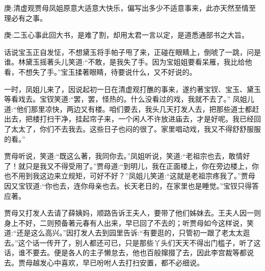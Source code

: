 

\begin{parag}
    \begin{note}庚:清虚观贾母凤姐原意大适意大快乐，偏写出多少不适意事来，此亦天然至情至理必有之事。\end{note}
\end{parag}


\begin{parag}
    \begin{note}庚:二玉心事此回大书，是难了割，却用太君一言以定，是道悉通部书之大旨。\end{note}
\end{parag}


\begin{parag}
    话说宝玉正自发怔，不想黛玉将手帕子甩了来，正碰在眼睛上，倒唬了一跳，问是谁。林黛玉摇著头儿笑道:“不敢，是我失了手。因为宝姐姐要看呆雁，我比给他看，不想失了手。”宝玉揉著眼睛，待要说什么，又不好说的。
\end{parag}


\begin{parag}
    一时，凤姐儿来了，因说起初一日在清虚观打醮的事来，遂约著宝钗、宝玉、黛玉等看戏去。宝钗笑道:“罢，罢，怪热的。什么没看过的戏，我就不去了。” 凤姐儿道:“他们那里凉快，两边又有楼。咱们要去，我头几天打发人去，把那些道士都赶出去，把楼打扫干净，挂起帘子来，一个闲人不许放进庙去，才是好呢。我已经回了太太了，你们不去我去。这些日子也闷的很了。家里唱动戏，我又不得舒舒服服的看。”
\end{parag}


\begin{parag}
    贾母听说，笑道:“既这么著，我同你去。”凤姐听说，笑道:“老祖宗也去，敢情好了！就只是我又不得受用了。”贾母道:“到明儿，我在正面楼上，你在旁边楼上，你也不用到我这边来立规矩，可好不好？”凤姐儿笑道:“这就是老祖宗疼我了。”贾母因又宝钗道:“你也去，连你母亲也去。长天老日的，在家里也是睡觉。”宝钗只得答应著。
\end{parag}


\begin{parag}
    贾母又打发人去请了薛姨妈，顺路告诉王夫人，要带了他们姊妹去。王夫人因一则身上不好，二则预备著元春有人出来，早已回了不去的；听贾母如今这样说，笑道:“还是这么高兴。”因打发人去到园里告诉:“有要逛的，只管初一跟了老太太逛去。”这个话一传开了，别人都还可已，只是那些丫头们天天不得出门槛子，听了这话，谁不要去。便是各人的主子懒怠去，他也百般撺掇了去，因此李宫裁等都说去。贾母越发心中喜欢，早已吩咐人去打扫安置，都不必细说。
\end{parag}


